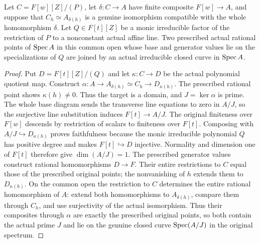 \begin{lemma}\label{lem:fc-birational-curve-closures}
\leanok
{}
Let $C=F[w][Z]/(P)$, let $\delta\colon C\to A$ have finite composite $F[w]\to A$, and suppose that
$C_h\simeq A_{\delta(h)}$ is a genuine isomorphism compatible with the whole homomorphism $\delta$.
Let $Q\in F[t][Z]$ be a monic irreducible factor of the restriction of $P$ to a nonconstant actual affine line.
Two prescribed actual rational points of $\operatorname{Spec} A$ in this common open whose base and generator values lie on
the specializations of $Q$ are joined by an actual irreducible closed curve in $\operatorname{Spec} A$.
\end{lemma}

\begin{proof}
Put $D=F[t][Z]/(Q)$ and let $\kappa\colon C\to D$ be the actual polynomial quotient map. Construct
$\alpha\colon A\to A_{\delta(h)}\simeq C_h\to D_{\kappa(h)}$.
The prescribed rational point shows $\kappa(h)\ne0$. Thus the target is a domain, and $J=\ker\alpha$ is prime.
The whole base diagram sends the transverse line equations to zero in $A/J$, so the surjective line substitution
induces $F[t]\to A/J$. The original finiteness over $F[w]$ descends by restriction of scalars to finiteness
over $F[t]$. Composing with $A/J\hookrightarrow D_{\kappa(h)}$ proves faithfulness because the monic irreducible
polynomial $Q$ has positive degree and makes $F[t]\hookrightarrow D$ injective. Normality and dimension one of
$F[t]$ therefore give $\dim(A/J)=1$.
The prescribed generator values construct rational homomorphisms $D\to F$. Their entire restrictions to $C$
equal those of the prescribed original points; the nonvanishing of $h$ extends them to $D_{\kappa(h)}$.
On the common open the restriction to $C$ determines the entire rational homomorphism of $A$: extend both
homomorphisms to $A_{\delta(h)}$, compare them through $C_h$, and use surjectivity of the actual isomorphism.
Thus their composites through $\alpha$ are exactly the prescribed original points, so both contain the actual
prime $J$ and lie on the genuine closed curve $\operatorname{Spec}(A/J)$ in the original spectrum.
\end{proof}


